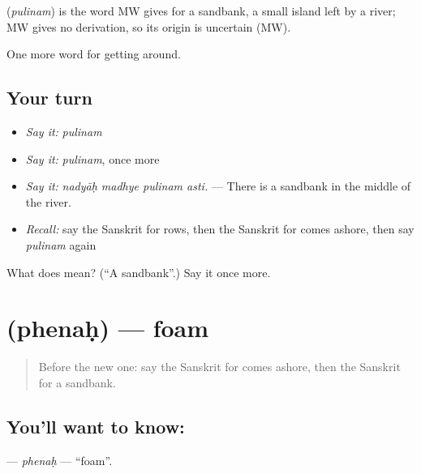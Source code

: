\begin{cousinweb}
\textbf{} (\emph{pulinam}) is the word MW gives for a sandbank, a small island left by a river; MW gives no derivation, so its origin is uncertain (MW).
\end{cousinweb}

\begin{grammarlens}[title={What you've built}]
One more word for getting around.
\end{grammarlens}

\subsection*{Your turn}
\begin{itemize}
\raggedright
  \item \emph{Say it:} \emph{pulinam}
  \item \emph{Say it:} \emph{pulinam}, once more
  \item \emph{Say it:} \emph{nadyāḥ madhye pulinam asti.} — There is a sandbank in the middle of the river.
  \item \emph{Recall:} say the Sanskrit for rows, then the Sanskrit for comes ashore, then say \emph{pulinam} again
\end{itemize}

\begin{tcolorbox}[breakable,colback=teal!4,colframe=teal!35!black,title={Before you move on}]
What does  mean? (\textquotedblleft{}A sandbank\textquotedblright{}.) Say it once more.
\end{tcolorbox}
\section[\texorpdfstring{\sk{फेनः} (phenaḥ)}{फेनः (phenaḥ)}]{ (phenaḥ) — foam}

\label{lesson:SA-C417-phenah}



\begin{quote}
Before the new one: say the Sanskrit for comes ashore, then the Sanskrit for a sandbank.
\end{quote}

\subsection*{You'll want to know: }
\textbf{} — \emph{phenaḥ} — \textquotedblleft{}foam\textquotedblright{}.

